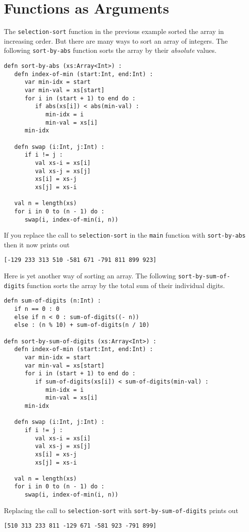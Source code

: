 \documentclass[10pt,oneside]{book}
\begin{document}
\section{Functions as Arguments}
The \texttt{\frenchspacing selection-sort} function in the previous example sorted the array in increasing order. But there are many ways to sort an array of integers. The following \texttt{\frenchspacing sort-by-abs} function sorts the array by their {\em absolute} values. 
\begin{lstlisting}
defn sort-by-abs (xs:Array<Int>) :
   defn index-of-min (start:Int, end:Int) :
      var min-idx = start
      var min-val = xs[start]
      for i in (start + 1) to end do :
         if abs(xs[i]) < abs(min-val) :
            min-idx = i
            min-val = xs[i]
      min-idx

   defn swap (i:Int, j:Int) :
      if i != j :
         val xs-i = xs[i]
         val xs-j = xs[j]
         xs[i] = xs-j
         xs[j] = xs-i
   
   val n = length(xs)
   for i in 0 to (n - 1) do :
      swap(i, index-of-min(i, n))
\end{lstlisting}
If you replace the call to \texttt{\frenchspacing selection-sort} in the \texttt{\frenchspacing main} function with \texttt{\frenchspacing sort-by-abs} then it now prints out
\begin{lstlisting}
[-129 233 313 510 -581 671 -791 811 899 923]
\end{lstlisting}

Here is yet another way of sorting an array. The following \texttt{\frenchspacing sort-by-sum-of-digits} function sorts the array by the total sum of their individual digits.
\begin{lstlisting}
defn sum-of-digits (n:Int) :
   if n == 0 : 0
   else if n < 0 : sum-of-digits((- n))
   else : (n % 10) + sum-of-digits(n / 10)

defn sort-by-sum-of-digits (xs:Array<Int>) :
   defn index-of-min (start:Int, end:Int) :
      var min-idx = start
      var min-val = xs[start]
      for i in (start + 1) to end do :
         if sum-of-digits(xs[i]) < sum-of-digits(min-val) :
            min-idx = i
            min-val = xs[i]
      min-idx

   defn swap (i:Int, j:Int) :
      if i != j :
         val xs-i = xs[i]
         val xs-j = xs[j]
         xs[i] = xs-j
         xs[j] = xs-i
   
   val n = length(xs)
   for i in 0 to (n - 1) do :
      swap(i, index-of-min(i, n))
\end{lstlisting}
Replacing the call to \texttt{\frenchspacing selection-sort} with \texttt{\frenchspacing sort-by-sum-of-digits} prints out
\begin{lstlisting}
[510 313 233 811 -129 671 -581 923 -791 899]
\end{lstlisting}
\end{document}
